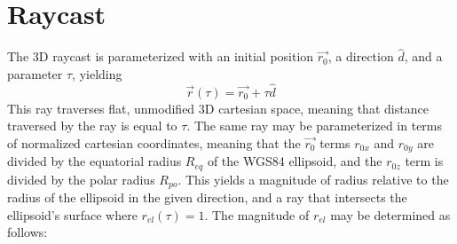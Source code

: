 \documentclass[aps,ams,prl,twocolumn,superscriptaddress]{revtex4-1}
\begin{document}
\section{Raycast}
The 3D raycast is parameterized with an initial position $\vec{r_0}$, a direction $\hat{d}$, and a parameter $\tau$, yielding
\begin{equation}\label{eqn:r_of_tau}
 \vec{r}(\tau) = \vec{r_0} + \tau \hat{d}
\end{equation}
This ray traverses flat, unmodified 3D cartesian space, meaning that distance traversed by the ray is equal to $\tau$.
The same ray may be parameterized in terms of normalized cartesian coordinates,
meaning that the $\vec{r_0}$ terms $r_{0x}$ and $r_{0y}$ are divided by the equatorial radius $R_{eq}$ of the WGS84 ellipsoid,
and the $r_{0z}$ term is divided by the polar radius $R_{po}$.
This yields a magnitude of radius relative to the radius of the ellipsoid in the given direction, and a ray that intersects the ellipsoid's surface
where $r_{el}(\tau) = 1$.
The magnitude of $r_{el}$ may be determined as follows:
\end{document}
